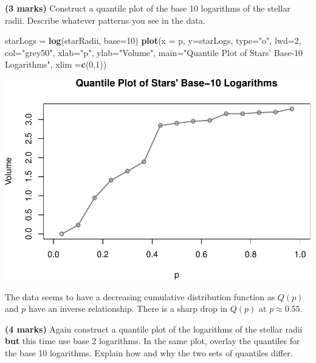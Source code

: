 \documentclass[9pt,letter]{article}
\newenvironment{Shaded}{\begin{snugshade}}{\end{snugshade}}
\newcommand{\KeywordTok}[1]{\textcolor[rgb]{0.13,0.29,0.53}{\textbf{#1}}}
\newcommand{\DataTypeTok}[1]{\textcolor[rgb]{0.13,0.29,0.53}{#1}}
\newcommand{\DecValTok}[1]{\textcolor[rgb]{0.00,0.00,0.81}{#1}}
\newcommand{\StringTok}[1]{\textcolor[rgb]{0.31,0.60,0.02}{#1}}
\newcommand{\NormalTok}[1]{#1}
\begin{document}
\item 

\textbf{(3 marks)} Construct a quantile plot of the base 10 logarithms
of the stellar radii. Describe whatever patterns you see in the data.

\begin{Shaded}
\begin{Highlighting}[]
\NormalTok{starLogs =}\StringTok{ }\KeywordTok{log}\NormalTok{(starRadii, }\DataTypeTok{base=}\DecValTok{10}\NormalTok{)}
\KeywordTok{plot}\NormalTok{(}\DataTypeTok{x =}\NormalTok{ p, }\DataTypeTok{y=}\NormalTok{starLogs, }
      \DataTypeTok{type=}\StringTok{"o"}\NormalTok{, }\DataTypeTok{lwd=}\DecValTok{2}\NormalTok{, }\DataTypeTok{col=}\StringTok{"grey50"}\NormalTok{,}
      \DataTypeTok{xlab=}\StringTok{"p"}\NormalTok{, }\DataTypeTok{ylab=}\StringTok{"Volume"}\NormalTok{,}
      \DataTypeTok{main=}\StringTok{"Quantile Plot of Stars' Base-10 Logarithms"}\NormalTok{,}
      \DataTypeTok{xlim =}\KeywordTok{c}\NormalTok{(}\DecValTok{0}\NormalTok{,}\DecValTok{1}\NormalTok{))}
\end{Highlighting}
\end{Shaded}

\includegraphics{a3_solutions_files/figure-latex/unnamed-chunk-16-1.pdf}

The data seems to have a decreasing cumulative distribution function as
\(Q(p)\) and \(p\) have an inverse relationship. There is a sharp drop
in \(Q(p)\) at \(p \approx 0.55\).

\item 

\textbf{(4 marks)} Again construct a quantile plot of the logarithms of
the stellar radii \textbf{but} this time use base 2 logarithms. In the
same plot, overlay the quantiles for the base 10 logarithms. Explain how
and why the two sets of quantiles differ.
\end{document}
